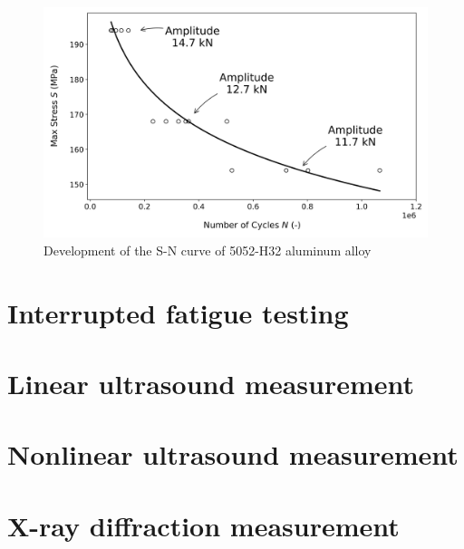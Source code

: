 \begin{figure}[tb]
  \includegraphics[width=\linewidth]{fig/sn_curve.png}
  \caption{Development of the S-N curve of 5052-H32 aluminum alloy}
  \label{fig: raw sn curve}
\end{figure}

\section{Interrupted fatigue testing}

\section{Linear ultrasound measurement}
\section{Nonlinear ultrasound measurement}
\section{X-ray diffraction measurement}
